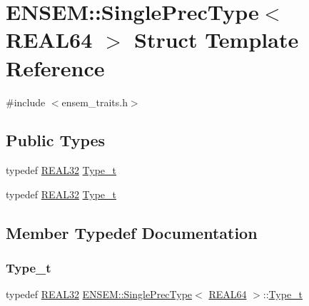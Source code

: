 \hypertarget{structENSEM_1_1SinglePrecType_3_01REAL64_01_4}{}\section{E\+N\+S\+EM\+:\+:Single\+Prec\+Type$<$ R\+E\+A\+L64 $>$ Struct Template Reference}
\label{structENSEM_1_1SinglePrecType_3_01REAL64_01_4}


{\ttfamily \#include $<$ensem\+\_\+traits.\+h$>$}

\subsection*{Public Types}
\begin{DoxyCompactItemize}
\item 
typedef \mbox{\hyperlink{namespaceENSEM_a7540d01191172323e9073283d772576d}{R\+E\+A\+L32}} \mbox{\hyperlink{structENSEM_1_1SinglePrecType_3_01REAL64_01_4_a931deb5906e330bffb27804fd850d061}{Type\+\_\+t}}
\item 
typedef \mbox{\hyperlink{namespaceENSEM_a7540d01191172323e9073283d772576d}{R\+E\+A\+L32}} \mbox{\hyperlink{structENSEM_1_1SinglePrecType_3_01REAL64_01_4_a931deb5906e330bffb27804fd850d061}{Type\+\_\+t}}
\end{DoxyCompactItemize}


\subsection{Member Typedef Documentation}
\mbox{\label{structENSEM_1_1SinglePrecType_3_01REAL64_01_4_a931deb5906e330bffb27804fd850d061}} 
\subsubsection{\texorpdfstring{Type\_t}{Type\_t}\hspace{0.1cm}{\footnotesize\ttfamily [1/2]}}
{\footnotesize\ttfamily typedef \mbox{\hyperlink{namespaceENSEM_a7540d01191172323e9073283d772576d}{R\+E\+A\+L32}} \mbox{\hyperlink{structENSEM_1_1SinglePrecType}{E\+N\+S\+E\+M\+::\+Single\+Prec\+Type}}$<$ \mbox{\hyperlink{namespaceENSEM_a85b215b9f1f43715aebee01718e25082}{R\+E\+A\+L64}} $>$\+::\mbox{\hyperlink{structENSEM_1_1SinglePrecType_3_01REAL64_01_4_a931deb5906e330bffb27804fd850d061}{Type\+\_\+t}}}

